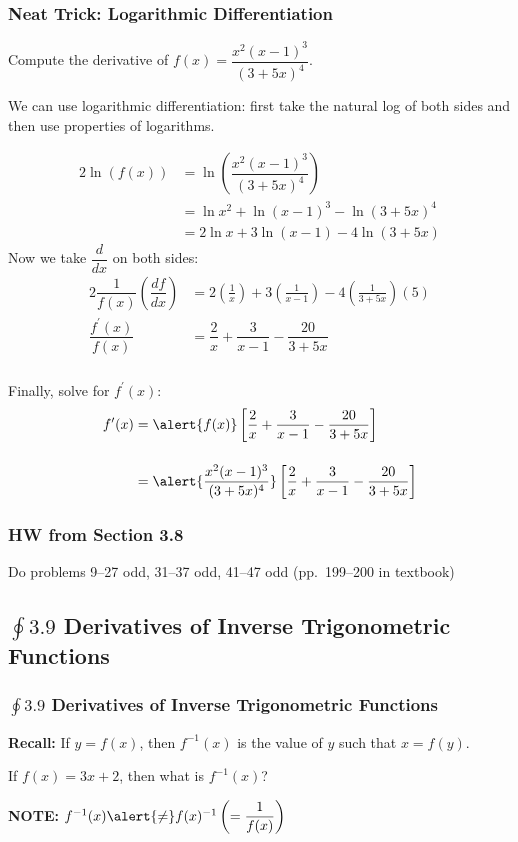 \documentclass[14pt]{beamer}
\begin{document}
\begin{frame}
\frametitle{\small Neat Trick: Logarithmic Differentiation}
\begin{ex}  Compute the derivative of $f(x)=\dfrac{x^2(x-1)^3}{(3+5x)^4}$. \end{ex}

We can use logarithmic differentiation: first take the natural log of both sides and then use properties of logarithms.
\end{frame}

\begin{frame}
\small
\begin{alignat*}{2}
\ln(f(x)) &= \ln \left( \dfrac{x^2(x-1)^3}{(3+5x)^4} \right) \\[0.5pc]
&= \ln{x^2} + \ln{(x-1)^3}-\ln{(3+5x)^4} \\[0.5pc]
&= 2\ln x + 3\ln(x-1)-4\ln(3+5x)
\end{alignat*}
\alert{Now} we take $\dfrac{d}{dx}$ on both sides:
\begin{alignat*}{2}
\dfrac{1}{f(x)}\left(\dfrac{df}{dx}\right) &= 2\left(\frac{1}{x}\right) + 3\left(\frac{1}{x-1}\right) - 4\left(\frac{1}{3+5x}\right)(5) \\[1pc]
\dfrac{f^{\prime}(x)}{f(x)} &= \dfrac{2}{x} + \dfrac{3}{x-1} - \dfrac{20}{3+5x}
\end{alignat*}
\end{frame}

\begin{frame}
\frametitle{}
Finally, solve for $f^{\prime}(x)$:
\begin{alignat*}{2}
f^{\prime}(x) &= \alert{f(x)} \left[ \dfrac{2}{x} + \dfrac{3}{x-1} - \dfrac{20}{3+5x} \right] \\[1pc]
&= \alert{\frac{x^2 (x-1)^3}{(3+5x)^4}} \left[ \dfrac{2}{x} + \dfrac{3}{x-1} - \dfrac{20}{3+5x} \right]
\end{alignat*}
\end{frame}

\begin{frame}
\frametitle{HW from Section 3.8}
Do problems 9--27 odd, 31--37 odd, 41--47 odd (pp.\ 199--200 in textbook)
\end{frame}

\begin{frame}
\subsection[$\oint 3.9$ Derivatives of Inverse Trigonometric Functions]{$\oint 3.9$ Derivatives of Inverse Trigonometric Functions}
\frametitle{\small $\oint 3.9$ Derivatives of Inverse Trigonometric Functions}
\small 
{\bf Recall:} If $y=f(x)$, then $f^{-1}(x)$ is the value of $y$ such that $x=f(y)$.

\vspace{1pc}
\begin{ex} If $f(x)=3x+2$, then what is $f^{-1}(x)$? \end{ex}

\vspace{2pc}
{\bf NOTE:}  $f^{-1}(x)\alert{\neq} f(x)^{-1}\left(=\dfrac{1}{f(x)}\right)$
\end{frame}
\end{document}

